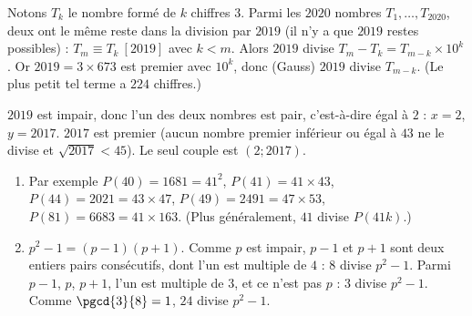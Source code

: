 \begin{corrige}
\begin{sol}
\begin{enumerate}
\end{enumerate}
\end{sol}
%
\begin{sol}
Notons $T_k$ le nombre form\'e de $k$ chiffres $3$. Parmi les $2020$ nombres $T_1, \ldots, T_{2020}$, deux ont le m\^eme reste
dans la division par $2019$ (il n'y a que $2019$ restes possibles) : $T_m \equiv T_k \ [2019]$ avec $k < m$.
Alors $2019$ divise $T_m - T_k = T_{m-k} \times 10^k$. Or $2019 = 3 \times 673$ est premier avec $10^k$, donc (Gauss)
$2019$ divise $T_{m-k}$. (Le plus petit tel terme a $224$ chiffres.)
\end{sol}
%
\begin{sol}
$2019$ est impair, donc l'un des deux nombres est pair, c'est-\`a-dire \'egal \`a $2$ : $x = 2$, $y = 2017$.
$2017$ est premier (aucun nombre premier inf\'erieur ou \'egal \`a $43$ ne le divise et $\sqrt{2017} < 45$). Le seul couple est $(2 ; 2017)$.
\end{sol}
%
\begin{sol}
\begin{enumerate}
\item Par exemple $P(40) = 1681 = 41^2$, $P(41) = 41 \times 43$, $P(44) = 2021 = 43 \times 47$, $P(49) = 2491 = 47 \times 53$,
      $P(81) = 6683 = 41 \times 163$. (Plus g\'en\'eralement, $41$ divise $P(41k)$.)
\item $p^2 - 1 = (p-1)(p+1)$. Comme $p$ est impair, $p - 1$ et $p + 1$ sont deux entiers pairs cons\'ecutifs, dont l'un est multiple de $4$ :
      $8$ divise $p^2 - 1$. Parmi $p - 1$, $p$, $p + 1$, l'un est multiple de $3$, et ce n'est pas $p$ : $3$ divise $p^2 - 1$.
      Comme $\pgcd{3}{8} = 1$, $24$ divise $p^2 - 1$.
\end{enumerate}
\end{sol}
\end{corrige}

